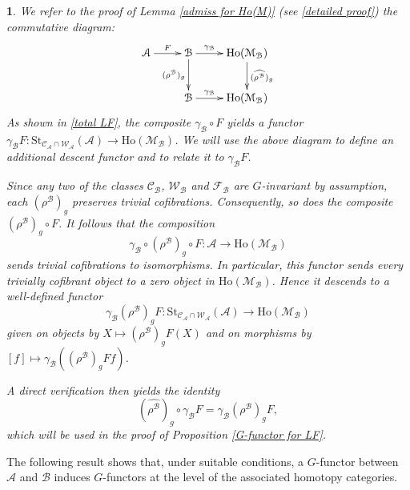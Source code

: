 \documentclass[12pt,twoside]{amsart}
\theoremstyle{bfupright head,slanted body}
\theoremstyle{bfupright head,upright body}
\theoremstyle{fixed bf head,slanted body}
\theoremstyle{fixed bf head,upright body}
\theoremstyle{numbered paragraph}
\newtheorem{ipg}[res]{}
\numberwithin{equation}{res}
\newcommand{\calC}{\mathcal{C}}
\newcommand{\calW}{\mathcal{W}}
\newcommand{\calF}{\mathcal{F}}
\newcommand{\calA}{\mathcal{A}}
\newcommand{\calB}{\mathcal{B}}
\newcommand{\calM}{\mathcal{M}}
\newcommand{\Ho}{\mathrm{Ho}}
\newcommand{\St}{\mathrm{St}}
\begin{document}
\begin{ipg} \label{equ for F}
We refer to the proof of Lemma \ref{admiss for Ho(M)} (see \ref{detailed proof}) the commutative diagram:
\[
\xymatrix{
   \calA
\ar[r]^-{F}
&  \calB
\ar[d]_-{(\rho^\calB)_g}
\ar[r]^-{\gamma_\calB}
&  \Ho(\calM_\calB)
\ar[d]^-{(\widehat{\rho^\calB})_g}            \\
&  \calB
\ar[r]^-{\gamma_\calB}
&  \Ho(\calM_\calB)                             }
\]
As shown in \ref{total LF}, the composite \(\gamma_\calB\circ F\) yields a functor \(\gamma_\calB F : \St_{\calC_\calA \cap \calW_\calA}(\calA) \longrightarrow \Ho(\calM_\calB)\).
We will use the above diagram to define an additional descent functor and to relate it to \(\gamma_\calB F\).


Since any two of the classes $\calC_\calB$, $\calW_\calB$ and $\calF_\calB$ are $G$-invariant by assumption, each $(\rho^\calB)_g$ preserves trivial cofibrations.
Consequently, so does the composite $(\rho^\calB)_g \circ F$.
It follows that the composition
\[
\gamma_{\calB} \circ (\rho^\calB)_g \circ F : \calA \to \Ho(\calM_{\calB})
\]
sends trivial cofibrations to isomorphisms.
In particular, this functor sends every trivially cofibrant object to a zero object in $\Ho(\calM_{\calB})$.
Hence it descends to a well-defined functor
\[
\gamma_{\calB} (\rho^\calB)_g F : \St_{\calC_\calA \cap \calW_\calA}(\calA) \to \Ho(\calM_{\calB})
\]
given on objects by \(X\mapsto (\rho^\calB)_g F(X)\) and on morphisms by \([f]\mapsto \gamma_\calB((\rho^\calB)_g Ff)\).

A direct verification then yields the identity
\[
(\widehat{\rho^\calB})_g \circ \gamma_\calB F = \gamma_\calB(\rho^\calB)_g F,
\]
which will be used in the proof of Proposition \ref{G-functor for LF}.
\end{ipg}

The following result shows that, under suitable conditions, a \(G\)-functor between \(\calA\) and \(\calB\) induces \(G\)-functors at the level of the associated homotopy categories.
\end{document}

